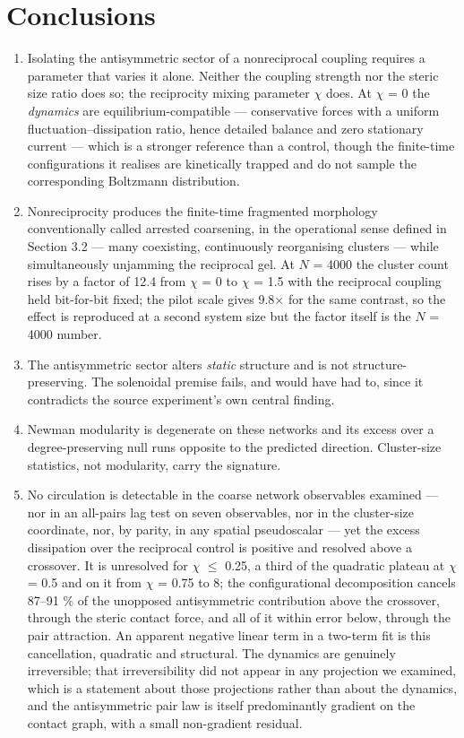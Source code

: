 \documentclass[aps,pre,preprint,superscriptaddress,nofootinbib,longbibliography]{revtex4-2}
\begin{document}
\section{Conclusions}

\begin{enumerate}
\item Isolating the antisymmetric sector of a nonreciprocal coupling requires a parameter that varies it alone. Neither the coupling strength nor the steric size ratio does so; the reciprocity mixing parameter $\chi$ does. At $\chi$ = 0 the \emph{dynamics} are equilibrium-compatible --- conservative forces with a uniform fluctuation--dissipation ratio, hence detailed balance and zero stationary current --- which is a stronger reference than a control, though the finite-time configurations it realises are kinetically trapped and do not sample the corresponding Boltzmann distribution.
\item Nonreciprocity produces the finite-time fragmented morphology conventionally called arrested coarsening, in the operational sense defined in Section 3.2 --- many coexisting, continuously reorganising clusters --- while simultaneously unjamming the reciprocal gel. At $N$ = 4000 the cluster count rises by a factor of 12.4 from $\chi$ = 0 to $\chi$ = 1.5 with the reciprocal coupling held bit-for-bit fixed; the pilot scale gives 9.8$\times$ for the same contrast, so the effect is reproduced at a second system size but the factor itself is the $N$ = 4000 number.
\item The antisymmetric sector alters \emph{static} structure and is not structure-preserving. The solenoidal premise fails, and would have had to, since it contradicts the source experiment's own central finding.
\item Newman modularity is degenerate on these networks and its excess over a degree-preserving null runs opposite to the predicted direction. Cluster-size statistics, not modularity, carry the signature.
\item No circulation is detectable in the coarse network observables examined --- nor in an all-pairs lag test on seven observables, nor in the cluster-size coordinate, nor, by parity, in any spatial pseudoscalar --- yet the excess dissipation over the reciprocal control is positive and resolved above a crossover. It is unresolved for $\chi$ $\le$ 0.25, a third of the quadratic plateau at $\chi$ = 0.5 and on it from $\chi$ = 0.75 to 8; the configurational decomposition cancels 87--91 \% of the unopposed antisymmetric contribution above the crossover, through the steric contact force, and all of it within error below, through the pair attraction. An apparent negative linear term in a two-term fit is this cancellation, quadratic and structural. The dynamics are genuinely irreversible; that irreversibility did not appear in any projection we examined, which is a statement about those projections rather than about the dynamics, and the antisymmetric pair law is itself predominantly gradient on the contact graph, with a small non-gradient residual.

\end{enumerate}
\end{document}
